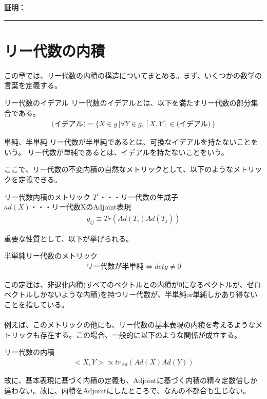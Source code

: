 \documentclass[dvipdfmx,a4paper,10.5pt]{article}
\numberwithin{equation}{section}
\newenvironment{proofbox}
{\begin{prooflabel}\textbf{証明：}\end{prooflabel}\vspace{0.8em}}
{\par\vspace{1em}\hrule\vspace{1em}}
\begin{document}
\begin{proofbox}
\begin{enumerate}
\end{enumerate}
\end{proofbox}
\section{リー代数の内積}
この章では、リー代数の内積の構造についてまとめる。まず、いくつかの数学の言葉を定義する。
\begin{defbox}{リー代数のイデアル}
    リー代数のイデアルとは、以下を満たすリー代数の部分集合である。
    \begin{align*}
        \text{(イデアル)}=\{X\in g \,|\forall Y\in g,[X,Y]\in \text{(イデアル)}\,\}
    \end{align*}
\end{defbox}
\begin{defbox}{単純、半単純}
リー代数が半単純であるとは、可換なイデアルを持たないことをいう。
リー代数が単純であるとは、イデアルを持たないことをいう。
\end{defbox}
ここで、リー代数の不変内積の自然なメトリックとして、以下のようなメトリックを定義できる。
\begin{defbox}{リー代数内積のメトリック}
$T^{i}$・・・リー代数の生成子\\
$ad(X)$・・・リー代数XのAdjoint表現\\
\begin{align*}
    g_{ij}\equiv Tr(Ad(T_{i})Ad(T_{j}))
\end{align*}
\end{defbox}
重要な性質として、以下が挙げられる。
\begin{resultbox}{半単純リー代数のメトリック}
\begin{align*}
    \text{リー代数が半単純}\iff detg\neq 0
\end{align*}
\end{resultbox}
この定理は、非退化内積(すべてのベクトルとの内積が0になるベクトルが、ゼロベクトルしかないような内積)を持つリー代数が、半単純or単純しかあり得ないことを指している。\\
\\
例えば、このメトリックの他にも、リー代数の基本表現の内積を考えるようなメトリックも存在する。この場合、一般的に以下のような関係が成立する。
\begin{resultbox}{リー代数の内積}
    \begin{align*}
        <X,Y>\propto tr_{Ad}(Ad(X)Ad(Y))
    \end{align*}
\end{resultbox}
故に、基本表現に基づく内積の定義も、Adjointに基づく内積の精々定数倍しか違わない。故に、内積をAdjointにしたところで、なんの不都合も生じない。\\
\end{document}
